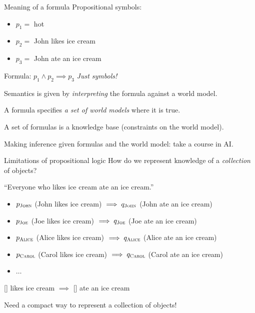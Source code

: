 \documentclass[usenames,dvipsnames,notes,11pt,aspectratio=169]{beamer}
\begin{document}
\begin{frame}
    {Meaning of a formula}
    Propositional symbols:\\
    \begin{itemize}
        \item[] $p_1=$ hot
        \item[] $p_2=$ John likes ice cream
        \item[] $p_3=$ John ate an ice cream
    \end{itemize}
    Formula: $p_1 \land p_2 \implies p_3$  \hspace{2em} \emph{Just symbols!}

    Semantics is given by \emph{interpreting}  the formula against a world model.

    A formula specifies \emph{a set of world models} where it is true.

    A set of formulas is a knowledge base (constraints on the world model).

    Making inference given formulas and the world model: take a course in AI.
\end{frame}

\begin{frame}
    {Limitations of propositional logic}
    How do we represent knowledge of a \emph{collection} of objects?

    ``Everyone who likes ice cream ate an ice cream.''\\
    \begin{itemize}
        \item[] $p_{\textsc{John}}$ (John likes ice cream) $\implies q_{\textsc{John}}$ (John ate an ice cream)
        \item[] $p_{\textsc{Joe}}$ (Joe likes ice cream) $\implies q_{\textsc{Joe}}$ (Joe ate an ice cream)
        \item[] $p_{\textsc{Alice}}$ (Alice likes ice cream) $\implies q_{\textsc{Alice}}$ (Alice ate an ice cream)
        \item[] $p_{\textsc{Carol}}$ (Carol likes ice cream) $\implies q_{\textsc{Carol}}$ (Carol ate an ice cream)
        \item[] $\ldots$
    \end{itemize}

    [\hspace{2em}] likes ice cream $\implies$ [\hspace{2em}] ate an ice cream

    Need a compact way to represent a collection of objects!
\end{frame}
\end{document}
